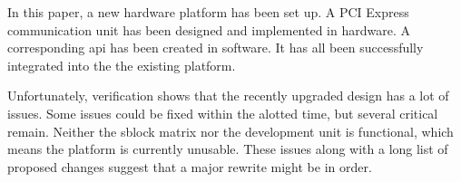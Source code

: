 In this paper, a new hardware platform has been set up.
A PCI Express communication unit has been designed and implemented in hardware.
A corresponding api has been created in software.
It has all been successfully integrated into the the existing platform.

Unfortunately, verification shows that the recently upgraded design has a lot of issues.
Some issues could be fixed within the alotted time, but several critical remain.
Neither the sblock matrix nor the development unit is functional, which means the platform is currently unusable.
These issues along with a long list of proposed changes suggest that a major rewrite might be in order.

